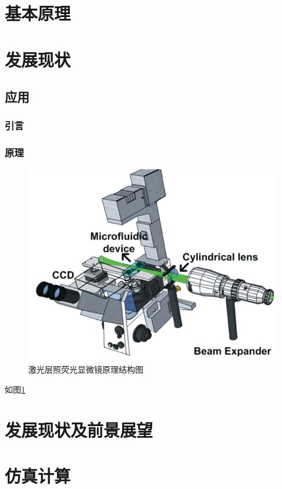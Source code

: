 \setlength{\parindent}{2em}

\section{基本原理}

\section{发展现状}

\subsection{应用}
\subsubsection{引言}

\subsubsection{原理}
\begin{figure}[ht]
	\centering
	\includegraphics[height=0.7\textwidth]{zhutoujing.png}
	\caption{激光层照荧光显微镜原理结构图\cite{Pampaloni2015Light}}
	\label{fig:4}
\end{figure}
如图\ref{fig:4}

\section{发展现状及前景展望}

\section{仿真计算}
